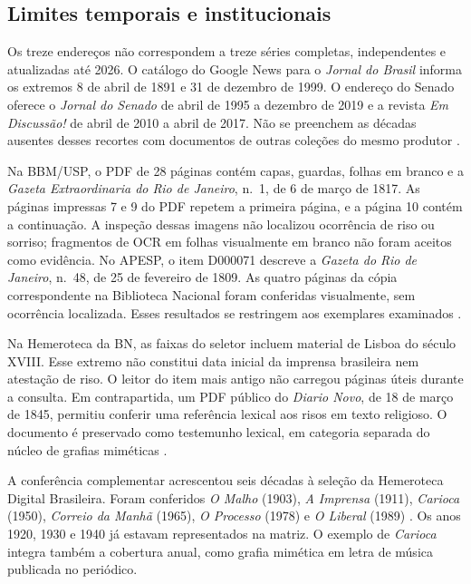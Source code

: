 \subsection{Limites temporais e institucionais}

Os treze endereços não correspondem a treze séries completas, independentes e atualizadas até 2026. O catálogo do Google News para o \textit{Jornal do Brasil} informa os extremos 8 de abril de 1891 e 31 de dezembro de 1999. O endereço do Senado oferece o \textit{Jornal do Senado} de abril de 1995 a dezembro de 2019 e a revista \textit{Em Discussão!} de abril de 2010 a abril de 2017. Não se preenchem as décadas ausentes desses recortes com documentos de outras coleções do mesmo produtor \cite{r3archiveH07,r3archiveH09}.

Na BBM/USP, o PDF de 28 páginas contém capas, guardas, folhas em branco e a \textit{Gazeta Extraordinaria do Rio de Janeiro}, n.~1, de 6 de março de 1817. As páginas impressas 7 e 9 do PDF repetem a primeira página, e a página 10 contém a continuação. A inspeção dessas imagens não localizou ocorrência de riso ou sorriso; fragmentos de OCR em folhas visualmente em branco não foram aceitos como evidência. No APESP, o item D000071 descreve a \textit{Gazeta do Rio de Janeiro}, n.~48, de 25 de fevereiro de 1809. As quatro páginas da cópia correspondente na Biblioteca Nacional foram conferidas visualmente, sem ocorrência localizada. Esses resultados se restringem aos exemplares examinados \cite{r3archiveH12,r3archiveH13}.

Na Hemeroteca da BN, as faixas do seletor incluem material de Lisboa do século XVIII. Esse extremo não constitui data inicial da imprensa brasileira nem atestação de riso. O leitor do item mais antigo não carregou páginas úteis durante a consulta. Em contrapartida, um PDF público do \textit{Diario Novo}, de 18 de março de 1845, permitiu conferir uma referência lexical aos risos em texto religioso. O documento é preservado como testemunho lexical, em categoria separada do núcleo de grafias miméticas \cite{r3doc20,r3archiveH05}.

A conferência complementar acrescentou seis décadas à seleção da Hemeroteca Digital Brasileira. Foram conferidos \textit{O Malho} (1903), \textit{A Imprensa} (1911), \textit{Carioca} (1950), \textit{Correio da Manhã} (1965), \textit{O Processo} (1978) e \textit{O Liberal} (1989) \cite{acervoD030,acervoD031,anual1950,acervoD032,acervoD033,acervoD034}. Os anos 1920, 1930 e 1940 já estavam representados na matriz. O exemplo de \textit{Carioca} integra também a cobertura anual, como grafia mimética em letra de música publicada no periódico.


